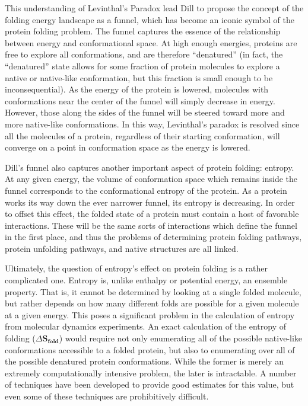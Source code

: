 This understanding of Levinthal's Paradox lead Dill to propose the concept of the folding energy landscape as a funnel\cite{Dill:2008p283}, which has become an iconic symbol of the protein folding problem. The funnel captures the essence of the relationship between energy and conformational space. At high enough energies, proteins are free to explore all conformations, and are therefore ``denatured'' (in fact, the ``denatured'' state allows for some fraction of protein molecules to explore a native or native-like conformation, but this fraction is small enough to be inconsequential). As the energy of the protein is lowered, molecules with conformations near the center of the funnel will simply decrease in energy. However, those along the sides of the funnel will be steered toward more and more native-like conformations. In this way, Levinthal's paradox is resolved since all the molecules of a protein, regardless of their starting conformation, will converge on a point in conformation space as the energy is lowered.

Dill's funnel also captures another important aspect of protein folding: entropy. At any given energy, the volume of conformation space which remains inside the funnel corresponds to the conformational entropy of the protein. As a protein works its way down the ever narrower funnel, its entropy is decreasing. In order to offset this effect, the folded state of a protein must contain a host of favorable interactions. These will be the same sorts of interactions which define the funnel in the first place, and thus the problems of determining protein folding pathways, protein unfolding pathways, and native structures are all linked. 

Ultimately, the question of entropy's effect on protein folding is a rather complicated one. Entropy is, unlike enthalpy or potential energy, an ensemble property. That is, it cannot be determined by looking at a single folded molecule, but rather depends on how many different folds are possible for a given molecule at a given energy\cite{Meirovitch:2007p317}. This poses a significant problem in the calculation of entropy from molecular dynamics experiments. An exact calculation of the entropy of folding ($\Delta \mathrm{\mathbf{S_{fold}}}$) would require not only enumerating all of the possible native-like conformations accessible to a folded protein, but also to enumerating over all of the possible denatured protein conformations. While the former is merely an extremely computationally intensive problem, the later is intractable. A number of techniques have been developed to provide good estimates for this value, but even some of these techniques are prohibitively difficult.

